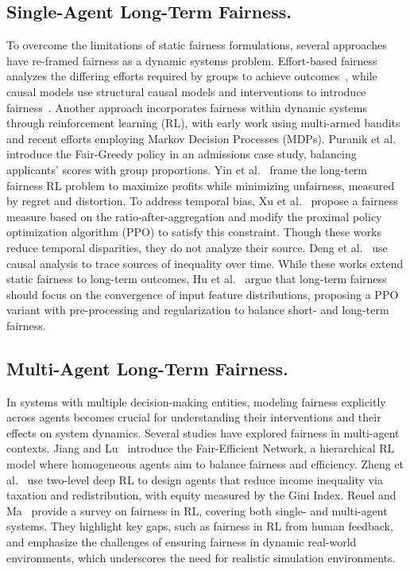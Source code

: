 \subsection{Single-Agent Long-Term Fairness.}
To overcome the limitations of static fairness formulations, several approaches have re-framed fairness as a dynamic systems problem. Effort-based fairness analyzes the differing efforts required by groups to achieve outcomes~\cite{heidari2019long, guldogan2022equal}, while causal models use structural causal models and interventions to introduce fairness~\cite{hu2020fair, hu2022achieving}. Another approach incorporates fairness within dynamic systems through reinforcement learning (RL), with early work using multi-armed bandits~\cite{joseph2016fairness} and recent efforts employing Markov Decision Processes (MDPs). Puranik et al.~\cite{puranik2022dynamic} introduce the Fair-Greedy policy in an admissions case study, balancing applicants’ scores with group proportions. Yin et al.~\cite{yin2024long} frame the long-term fairness RL problem to maximize profits while minimizing unfairness, measured by regret and distortion. To address temporal bias, Xu et al.~\cite{xuadapting} propose a fairness measure based on the ratio-after-aggregation and modify the proximal policy optimization algorithm (PPO) to satisfy this constraint. Though these works reduce temporal disparities, they do not analyze their source. Deng et al.~\cite{deng2024hides} use causal analysis to trace sources of inequality over time. While these works extend static fairness to long-term outcomes, Hu et al.~\cite{hu2023striking} argue that long-term fairness should focus on the convergence of input feature distributions, proposing a PPO variant with pre-processing and regularization to balance short- and long-term fairness.

\subsection{Multi-Agent Long-Term Fairness.} 
In systems with multiple decision-making entities, modeling fairness explicitly across agents becomes crucial for understanding their interventions and their effects on system dynamics. Several studies have explored fairness in multi-agent contexts. Jiang and Lu~\cite{jiang2019learning} introduce the Fair-Efficient Network, a hierarchical RL model where homogeneous agents aim to balance fairness and efficiency. Zheng et al.~\cite{zheng2022ai} use two-level deep RL to design agents that reduce income inequality via taxation and redistribution, with equity measured by the Gini Index. Reuel and Ma~\cite{reuel2024fairness} provide a survey on fairness in RL, covering both single- and multi-agent systems. They highlight key gaps, such as fairness in RL from human feedback, and emphasize the challenges of ensuring fairness in dynamic real-world environments, which underscores the need for realistic simulation environments.

